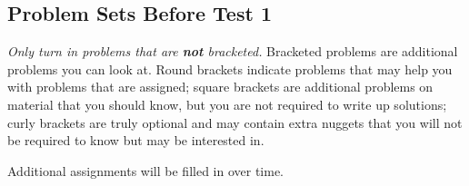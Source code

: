 \documentclass{article}
\begin{document}
\pagestyle{fancy}

\chead{}
\rhead{\thepage/\pageref{end}}
\lfoot{}
\rfoot{}

\begin{center}
  \large
%
%
\subsection*{Problem Sets Before Test 1}

\end{center}


\textit{Only turn in problems that are \textbf{not} bracketed.}
Bracketed problems are additional problems you can look at.
Round brackets indicate problems that may help you with problems that
are assigned; square brackets are additional problems on material
that you should know, but you are not required to write up solutions;
curly brackets are truly optional and may contain extra nuggets that you
will not be required to know but may be interested in.

Additional assignments will be filled in over time.

\bigskip
\end{document}
